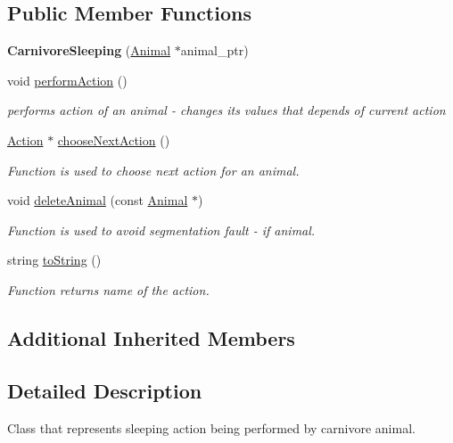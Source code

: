 \subsection*{Public Member Functions}
\begin{DoxyCompactItemize}
\item 
\hypertarget{class_carnivore_sleeping_a80e590b906f475e74e02853d0a7878bf}{}{\bfseries Carnivore\+Sleeping} (\hyperlink{class_animal}{Animal} $\ast$animal\+\_\+ptr)\label{class_carnivore_sleeping_a80e590b906f475e74e02853d0a7878bf}

\item 
void \hyperlink{class_carnivore_sleeping_a22f44ca1cde98236c29bd58089c2af18}{perform\+Action} ()
\begin{DoxyCompactList}\small\item\em performs action of an animal -\/ changes it\textquotesingle{}s values that depends of current action \end{DoxyCompactList}\item 
\hyperlink{class_action}{Action} $\ast$ \hyperlink{class_carnivore_sleeping_ad6783bd94c20821e9736d9f2f38934ab}{choose\+Next\+Action} ()
\begin{DoxyCompactList}\small\item\em Function is used to choose next action for an animal. \end{DoxyCompactList}\item 
void \hyperlink{class_carnivore_sleeping_ac4cb50b95fe030543e7a7de019c35383}{delete\+Animal} (const \hyperlink{class_animal}{Animal} $\ast$)
\begin{DoxyCompactList}\small\item\em Function is used to avoid segmentation fault -\/ if animal. \end{DoxyCompactList}\item 
string \hyperlink{class_carnivore_sleeping_a2805a35db94114af285978b9820f0f18}{to\+String} ()
\begin{DoxyCompactList}\small\item\em Function returns name of the action. \end{DoxyCompactList}\end{DoxyCompactItemize}
\subsection*{Additional Inherited Members}


\subsection{Detailed Description}
Class that represents sleeping action being performed by carnivore animal. 

